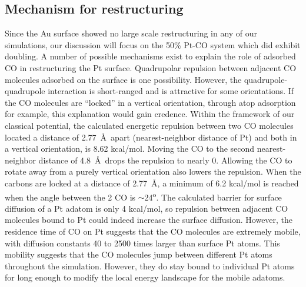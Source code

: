 \documentclass[journal = jpccck, manuscript = article]{achemso}
\begin{document}
\subsection{Mechanism for restructuring}
Since the Au surface showed no large scale restructuring in any of our
simulations, our discussion will focus on the 50\% Pt-CO system which
did exhibit doubling. A number of possible mechanisms exist to explain
the role of adsorbed CO in restructuring the Pt surface. Quadrupolar
repulsion between adjacent CO molecules adsorbed on the surface is one
possibility.  However, the quadrupole-quadrupole interaction is
short-ranged and is attractive for some orientations.  If the CO
molecules are ``locked'' in a vertical orientation, through atop
adsorption for example, this explanation would gain credence. Within
the framework of our classical potential, the calculated energetic
repulsion between two CO molecules located a distance of
2.77~\AA~apart (nearest-neighbor distance of Pt) and both in a
vertical orientation, is 8.62 kcal/mol. Moving the CO to the second
nearest-neighbor distance of 4.8~\AA~drops the repulsion to nearly
0. Allowing the CO to rotate away from a purely vertical orientation
also lowers the repulsion. When the carbons are locked at a distance
of 2.77~\AA, a minimum of 6.2 kcal/mol is reached when the angle
between the 2 CO is $\sim$24\textsuperscript{o}.  The calculated
barrier for surface diffusion of a Pt adatom is only 4 kcal/mol, so
repulsion between adjacent CO molecules bound to Pt could indeed
increase the surface diffusion. However, the residence time of CO on
Pt suggests that the CO molecules are extremely mobile, with diffusion
constants 40 to 2500 times larger than surface Pt atoms. This mobility
suggests that the CO molecules jump between different Pt atoms
throughout the simulation.  However, they do stay bound to individual
Pt atoms for long enough to modify the local energy landscape for the
mobile adatoms.
\end{document}
